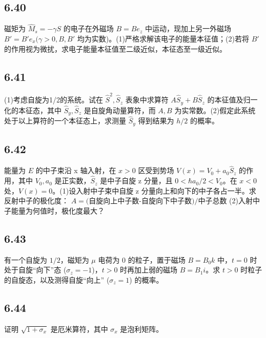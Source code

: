 \subsection{6.40}
磁矩为 $\hat{M}_s = -\gamma S$ 的电子在外磁场 $B = Be_z$ 中运动，现加上另一外磁场 $B' = B'e_x (\gamma > 0, B, B'$ 均为实数)。(1)严格求解该电子的能量本征值；(2)若将 $B'$ 的作用视为微扰，求电子能量本征值至二级近似，本征态至一级近似。

\subsection{6.41}
(1)考虑自旋为1/2的系统。试在 $\hat{S}^2, \hat{S}_z$ 表象中求算符 $A\hat{S}_y + B\hat{S}_z$ 的本征值及归一化的本征态，其中 $\hat{S}_y, \hat{S}_z$ 是自旋角动量算符，而 $A, B$ 为实常数。(2)假定此系统处于以上算符的一个本征态上，求测量 $\hat{S}_y$ 得到结果为 $h/2$ 的概率。

\subsection{6.42}
能量为 $E$ 的中子束沿 x 轴入射，在 $x>0$ 区受到势场 $V(x)=V_0+a_{0}\hat{S}_z$ 的作用，其中 $V_0,a_{0}$ 是正实数，$\hat{S}_z$ 是中子自旋 z 分量，且 $0<\hbar a_{0}/2<V_0$。在 $x<0$ 处，$V(x)=0$。(1)设入射中子束中自旋 z 分量向上和向下的中子各占一半。求反射中子的极化度： $A= \text{(自旋向上中子数-自旋向下中子数)/中子总数}$ (2)入射中子能量为何值时，极化度最大？

\subsection{6.43}
有一个自旋为 $1/2$，磁矩为 $\mu$ 电荷为 0 的粒子，置于磁场 $B = B_0 k$ 中，$t = 0$ 时处于自旋“向下”态 ($\sigma_z = -1$)，$t > 0$ 时再加上弱的磁场 $B = B_1 i$。求 $t > 0$ 时粒子的自旋态，以及测得自旋“向上” ($\sigma_z = 1$) 的概率。

\subsection{6.44}
证明 $\sqrt{1+\sigma_x}$ 是厄米算符，其中 $\sigma_x$ 是泡利矩阵。

